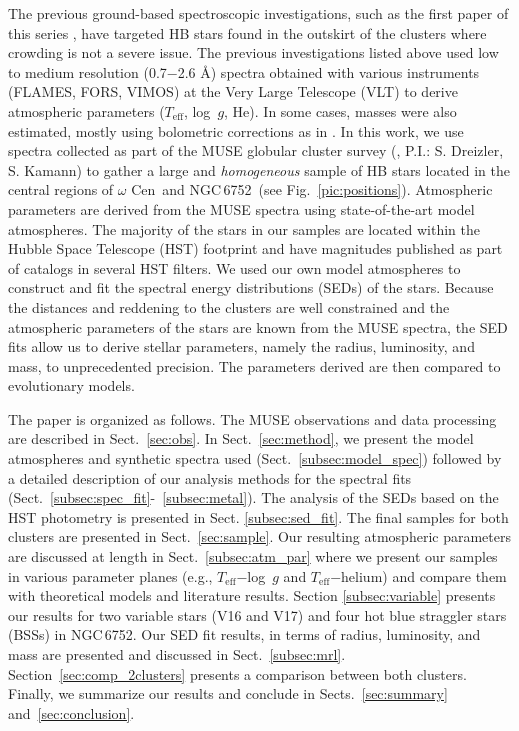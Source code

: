 \documentclass{aa}
\newcommand{\teff}{$T_{\text{eff}}$}
\newcommand{\Cen}{$\omega$ Cen}
\newcommand{\ngc}{NGC\,6752}
\begin{document}
The previous ground-based spectroscopic investigations, such as the first paper of this series \citep{latour2018}, have targeted HB stars found in the outskirt of the clusters where crowding is not a severe issue. The previous investigations listed above used low to medium resolution (0.7$-$2.6 \AA) spectra obtained with various instruments (FLAMES, FORS, VIMOS) at the Very Large Telescope (VLT) to derive atmospheric parameters (\teff, log~$g$, He). In some cases, masses were also estimated, mostly using bolometric corrections as in \citet{moehler2011}.
In this work, we use spectra collected as part of the MUSE globular cluster survey (\citealt{kamann2018}, P.I.: S. Dreizler, S. Kamann) to gather a large and \textit{homogeneous} sample of HB stars located in the central regions of \Cen\ and \ngc\ (see Fig.~\ref{pic:positions}). 
Atmospheric parameters
are derived from the MUSE spectra using state-of-the-art model atmospheres.
The majority of the stars in our samples are located within the Hubble Space Telescope (HST) footprint and have magnitudes published as part of catalogs in several HST filters. We used our own model atmospheres to construct and fit the spectral energy distributions (SEDs) of the stars. Because the distances and reddening to the clusters are well constrained and the atmospheric parameters of the stars are known from the MUSE spectra, the SED fits allow us to derive stellar parameters, namely the radius, luminosity, and mass, to unprecedented precision. The parameters derived are then compared to evolutionary models.  


The paper is organized as follows. 
The MUSE observations and data processing are described in Sect.~\ref{sec:obs}. In Sect.~\ref{sec:method}, we present the model atmospheres and synthetic spectra used (Sect.~\ref{subsec:model_spec}) followed by
a detailed description of our analysis methods for the spectral fits (Sect.~\ref{subsec:spec_fit}-~\ref{subsec:metal}). 
The analysis of the SEDs based on the HST photometry is presented in Sect. \ref{subsec:sed_fit}. The final samples for both clusters are presented in Sect.~\ref{sec:sample}. 
Our resulting atmospheric parameters are discussed at length in Sect.~\ref{subsec:atm_par} where we present our samples in various parameter planes (e.g., \teff$-$log~$g$ and \teff$-$helium) and compare them with theoretical models and literature results. Section \ref{subsec:variable} presents our results for two variable stars (V16 and V17) and four hot blue straggler stars (BSSs) in \ngc. Our SED fit results, in terms of radius, luminosity, and mass are presented and discussed in Sect.~\ref{subsec:mrl}. Section~\ref{sec:comp_2clusters} presents a comparison between both clusters. Finally, we summarize our results and conclude
in Sects.~\ref{sec:summary} and~\ref{sec:conclusion}. 
\end{document}
